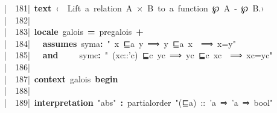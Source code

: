 \documentclass{article}
\newcommand{\syntaxCOMMENTC}[1]{\textcolor[rgb]{0.4,0.0,0.8}{#1}}
\newcommand{\syntaxKEYWORDA}[1]{\textcolor[rgb]{0.0,0.4,0.6}{\textbf{#1}}}
\newcommand{\syntaxKEYWORDB}[1]{\textcolor[rgb]{0.0,0.6,0.4}{\textbf{#1}}}
\newcommand{\syntaxLITERALA}[1]{\textcolor[rgb]{1.0,0.0,0.8}{#1}}
\newcommand{\syntaxOPERATOR}[1]{\textcolor[rgb]{0.0,0.0,0.0}{\textbf{#1}}}
\newcommand{\syntaxCOMMENTC}[1]{\textcolor[rgb]{0.4,0.0,0.8}{#1}}
\newcommand{\syntaxKEYWORDA}[1]{\textcolor[rgb]{0.0,0.4,0.6}{\textbf{#1}}}
\newcommand{\syntaxKEYWORDB}[1]{\textcolor[rgb]{0.0,0.6,0.4}{\textbf{#1}}}
\newcommand{\syntaxLITERALA}[1]{\textcolor[rgb]{1.0,0.0,0.8}{#1}}
\newcommand{\syntaxOPERATOR}[1]{\textcolor[rgb]{0.0,0.0,0.0}{\textbf{#1}}}
\newcommand{\syntaxCOMMENTC}[1]{\textcolor[rgb]{0.4,0.0,0.8}{#1}}
\newcommand{\syntaxKEYWORDA}[1]{\textcolor[rgb]{0.0,0.4,0.6}{\textbf{#1}}}
\newcommand{\syntaxKEYWORDB}[1]{\textcolor[rgb]{0.0,0.6,0.4}{\textbf{#1}}}
\newcommand{\syntaxLITERALA}[1]{\textcolor[rgb]{1.0,0.0,0.8}{#1}}
\newcommand{\syntaxOPERATOR}[1]{\textcolor[rgb]{0.0,0.0,0.0}{\textbf{#1}}}
\newcommand{\syntaxCOMMENTC}[1]{\textcolor[rgb]{0.4,0.0,0.8}{\textbf{#1}}}
\newcommand{\syntaxKEYWORDA}[1]{\textcolor[rgb]{0.0,0.4,0.6}{#1}}
\newcommand{\syntaxKEYWORDB}[1]{\textcolor[rgb]{0.0,0.6,0.4}{#1}}
\newcommand{\syntaxLITERALA}[1]{\textcolor[rgb]{1.0,0.0,0.8}{\textbf{#1}}}
\newcommand{\syntaxOPERATOR}[1]{\textcolor[rgb]{0.0,0.0,0.0}{#1}}
\newcommand{\syntaxCOMMENTC}[1]{\textcolor[rgb]{0.4,0.0,0.8}{#1}}
\newcommand{\syntaxKEYWORDA}[1]{\textcolor[rgb]{0.0,0.4,0.6}{\textbf{#1}}}
\newcommand{\syntaxKEYWORDB}[1]{\textcolor[rgb]{0.0,0.6,0.4}{\textbf{#1}}}
\newcommand{\syntaxLITERALA}[1]{\textcolor[rgb]{1.0,0.0,0.8}{#1}}
\newcommand{\syntaxOPERATOR}[1]{\textcolor[rgb]{0.0,0.0,0.0}{\textbf{#1}}}
\newcommand{\syntaxCOMMENTC}[1]{\textcolor[rgb]{0.4,0.0,0.8}{#1}}
\newcommand{\syntaxKEYWORDA}[1]{\textcolor[rgb]{0.0,0.4,0.6}{\textbf{#1}}}
\newcommand{\syntaxKEYWORDB}[1]{\textcolor[rgb]{0.0,0.6,0.4}{\textbf{#1}}}
\newcommand{\syntaxLITERALA}[1]{\textcolor[rgb]{1.0,0.0,0.8}{#1}}
\newcommand{\syntaxOPERATOR}[1]{\textcolor[rgb]{0.0,0.0,0.0}{\textbf{#1}}}
\newcommand{\syntaxCOMMENTC}[1]{\textcolor[rgb]{0.0,0.0,0.0}{#1}}
\newcommand{\syntaxKEYWORDA}[1]{\textcolor[rgb]{0.0,0.0,0.0}{#1}}
\newcommand{\syntaxKEYWORDB}[1]{\textcolor[rgb]{0.0,0.0,0.0}{#1}}
\newcommand{\gutter}[1]{\textcolor[rgb]{0,0,0}{{|}#1}}
\newcommand{\gutterH}[1]{\textcolor[rgb]{1,0,0}{{|}#1}}
\begin{document}
\gutter{\ \ 181{|}\ }\syntaxKEYWORDA{text}{\ }\syntaxCOMMENTC{‹}\syntaxCOMMENTC{{\ }}\syntaxCOMMENTC{{\ }}\syntaxCOMMENTC{L}\syntaxCOMMENTC{i}\syntaxCOMMENTC{f}\syntaxCOMMENTC{t}\syntaxCOMMENTC{{\ }}\syntaxCOMMENTC{a}\syntaxCOMMENTC{{\ }}\syntaxCOMMENTC{r}\syntaxCOMMENTC{e}\syntaxCOMMENTC{l}\syntaxCOMMENTC{a}\syntaxCOMMENTC{t}\syntaxCOMMENTC{i}\syntaxCOMMENTC{o}\syntaxCOMMENTC{n}\syntaxCOMMENTC{{\ }}\syntaxCOMMENTC{A}\syntaxCOMMENTC{{\ }}\syntaxCOMMENTC{×}\syntaxCOMMENTC{{\ }}\syntaxCOMMENTC{B}\syntaxCOMMENTC{{\ }}\syntaxCOMMENTC{t}\syntaxCOMMENTC{o}\syntaxCOMMENTC{{\ }}\syntaxCOMMENTC{a}\syntaxCOMMENTC{{\ }}\syntaxCOMMENTC{f}\syntaxCOMMENTC{u}\syntaxCOMMENTC{n}\syntaxCOMMENTC{c}\syntaxCOMMENTC{t}\syntaxCOMMENTC{i}\syntaxCOMMENTC{o}\syntaxCOMMENTC{n}\syntaxCOMMENTC{{\ }}\syntaxCOMMENTC{℘}\syntaxCOMMENTC{{\ }}\syntaxCOMMENTC{A}\syntaxCOMMENTC{{\ }}\syntaxCOMMENTC{{-}}\syntaxCOMMENTC{\usebox{\greaterthan}}\syntaxCOMMENTC{{\ }}\syntaxCOMMENTC{℘}\syntaxCOMMENTC{{\ }}\syntaxCOMMENTC{B}\syntaxCOMMENTC{.}\syntaxCOMMENTC{›}\hspace*{\fill}\\
\gutter{\ \ 182{|}\ }\hspace*{\fill}\\
\gutter{\ \ 183{|}\ }\syntaxKEYWORDA{locale}{\ }galois{\ }\syntaxOPERATOR{=}{\ }pre\usebox{\underscorebox}galois{\ }\syntaxOPERATOR{+}\hspace*{\fill}\\
\gutter{\ \ 184{|}\ }{\ }{\ }\syntaxKEYWORDB{assumes}{\ }syma\syntaxOPERATOR{:}{\ }\syntaxLITERALA{"{\ }x{\ }⊑a{\ }y{\ }⟹{\ }y{\ }⊑a{\ }x{\ }{\ }⟹{\ }x=y"}{\ }\hspace*{\fill}\\
\gutterH{\ \ 185{|}\ }{\ }{\ }\syntaxKEYWORDB{and}{\ }{\ }{\ }{\ }{\ }symc\syntaxOPERATOR{:}{\ }\syntaxLITERALA{"{\ }(xc::'c){\ }⊑c{\ }yc{\ }⟹{\ }yc{\ }⊑c{\ }xc{\ }{\ }⟹{\ }xc=yc"}\hspace*{\fill}\\
\gutter{\ \ 186{|}\ }\hspace*{\fill}\\
\gutter{\ \ 187{|}\ }\syntaxKEYWORDA{context}{\ }galois{\ }\syntaxKEYWORDB{begin}{\ }\hspace*{\fill}\\
\gutter{\ \ 188{|}\ }\hspace*{\fill}\\
\gutter{\ \ 189{|}\ }\syntaxKEYWORDA{interpretation}{\ }\syntaxLITERALA{"abs"}{\ }\syntaxOPERATOR{:}{\ }partial\usebox{\underscorebox}order{\ }\syntaxLITERALA{"(⊑a){\ }::{\ }'a{\ }⇒{\ }'a{\ }⇒{\ }bool"}\hspace*{\fill}\\
\end{document}
